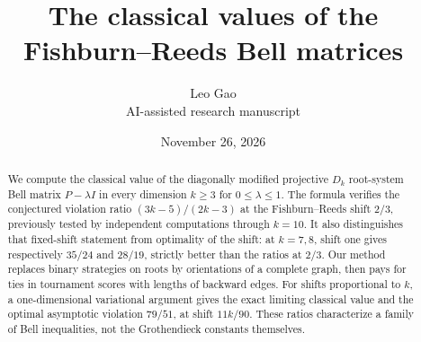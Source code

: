 \documentclass[11pt]{article}
\title{The classical values of the Fishburn--Reeds Bell matrices}
\author{Leo Gao\\{\small AI-assisted research manuscript}}
\date{November 26, 2026}
\begin{document}
\maketitle
\begin{abstract}
We compute the classical value of the diagonally modified projective $D_k$ root-system Bell matrix $P-\lambda I$ in every dimension $k\ge3$ for $0\le\lambda\le1$. The formula verifies the conjectured violation ratio $(3k-5)/(2k-3)$ at the Fishburn--Reeds shift $2/3$, previously tested by independent computations through $k=10$. It also distinguishes that fixed-shift statement from optimality of the shift: at $k=7,8$, shift one gives respectively $35/24$ and $28/19$, strictly better than the ratios at $2/3$. Our method replaces binary strategies on roots by orientations of a complete graph, then pays for ties in tournament scores with lengths of backward edges. For shifts proportional to $k$, a one-dimensional variational argument gives the exact limiting classical value and the optimal asymptotic violation $79/51$, at shift $11k/90$. These ratios characterize a family of Bell inequalities, not the Grothendieck constants themselves.
\end{abstract}
\end{document}
